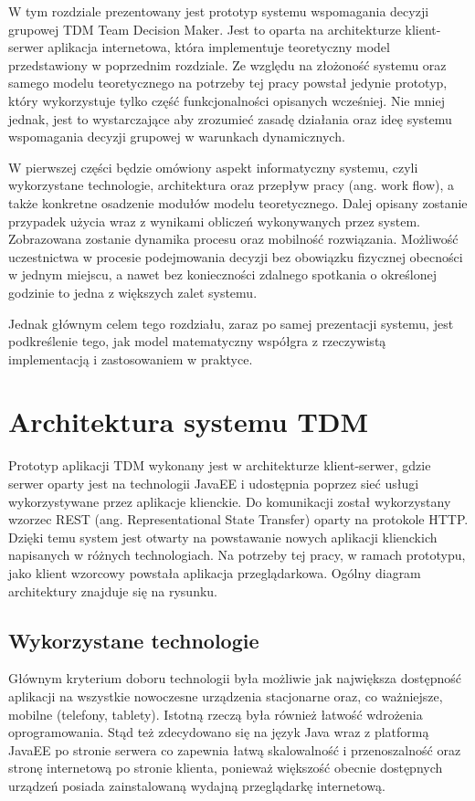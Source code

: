 W tym rozdziale prezentowany jest prototyp systemu wspomagania decyzji grupowej
TDM Team Decision Maker. Jest to oparta na architekturze klient-serwer
aplikacja internetowa, która implementuje teoretyczny model przedstawiony w
poprzednim rozdziale. Ze względu na złożoność systemu oraz samego modelu
teoretycznego na potrzeby tej pracy powstał jedynie prototyp, który wykorzystuje
tylko część funkcjonalności opisanych wcześniej. Nie mniej jednak, jest to
wystarczające aby zrozumieć zasadę działania oraz ideę systemu wspomagania
decyzji grupowej w warunkach dynamicznych.

W pierwszej części będzie omówiony aspekt informatyczny systemu,
czyli wykorzystane technologie, architektura oraz przepływ pracy (ang. work
flow), a także konkretne osadzenie modułów modelu teoretycznego.
Dalej opisany zostanie przypadek użycia wraz z wynikami obliczeń
wykonywanych przez system. Zobrazowana zostanie dynamika procesu oraz mobilność
rozwiązania. Możliwość uczestnictwa w procesie podejmowania decyzji bez
obowiązku fizycznej obecności w jednym miejscu, a nawet bez konieczności
zdalnego spotkania o określonej godzinie to jedna z większych zalet systemu.

Jednak głównym celem tego rozdziału, zaraz po samej prezentacji systemu, jest
podkreślenie tego, jak model matematyczny współgra z rzeczywistą implementacją i
zastosowaniem w praktyce. 

\section{Architektura systemu TDM}
Prototyp aplikacji TDM wykonany jest w architekturze klient-serwer, gdzie serwer
oparty jest na technologii JavaEE i udostępnia poprzez sieć usługi
wykorzystywane przez aplikacje klienckie. Do komunikacji został wykorzystany
wzorzec REST (ang. Representational State Transfer) oparty na protokole HTTP.
Dzięki temu system jest otwarty na powstawanie nowych aplikacji klienckich
napisanych w różnych technologiach. Na potrzeby tej pracy, w ramach prototypu,
jako klient wzorcowy powstała aplikacja przeglądarkowa. Ogólny diagram
architektury znajduje się na rysunku.

\subsection{Wykorzystane technologie}
Głównym kryterium doboru technologii była możliwie jak największa dostępność
aplikacji na wszystkie nowoczesne urządzenia stacjonarne oraz, co ważniejsze,
mobilne (telefony, tablety). Istotną rzeczą była również łatwość wdrożenia
oprogramowania. Stąd też zdecydowano się na język Java wraz z platformą JavaEE
po stronie serwera co zapewnia łatwą skalowalność i przenoszalność oraz
stronę internetową po stronie klienta, ponieważ większość obecnie dostępnych
urządzeń posiada zainstalowaną wydajną przeglądarkę internetową.

